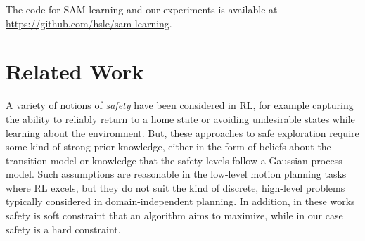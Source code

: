 \documentclass{article}
\begin{document}
The code for SAM learning and our experiments is available at \url{https://github.com/hsle/sam-learning}.


\section{Related Work}

A variety of notions of \emph{safety} have been considered in RL, for example capturing the ability to reliably return to a home state \cite{moldovan2012safe} or avoiding undesirable states  \cite{turchetta2016,wachi2018safe} while learning about the environment. 
But, these approaches to safe exploration require some kind of strong prior knowledge, either in the form of beliefs about the transition model or knowledge that the safety levels %
follow a Gaussian process model. 
Such assumptions are reasonable in the low-level motion planning tasks where RL excels, but they do not suit the kind of discrete, high-level problems typically considered in domain-independent planning.
In addition, in these works safety is soft constraint that an algorithm aims to maximize, while in our case safety is a hard constraint.
\end{document}
